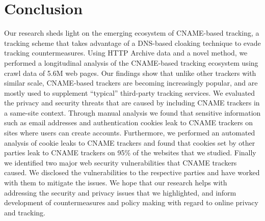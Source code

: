 \section{Conclusion}

Our research sheds light on the emerging ecosystem of CNAME-based tracking, a tracking scheme that takes advantage of a DNS-based cloaking technique to evade tracking countermeasures.
Using HTTP Archive data and a novel method, we performed a longitudinal analysis of the CNAME-based tracking ecosystem using crawl data of 5.6M web pages.
Our findings show that unlike other trackers with similar scale, CNAME-based trackers are becoming increasingly popular, and are mostly used to supplement ``typical'' third-party tracking services.
We evaluated the privacy and security threats that are caused by including CNAME trackers in a same-site context.
Through manual analysis we found that sensitive information such as email addresses and authentication cookies leak to CNAME trackers on sites where users can create accounts.
Furthermore, we performed an automated analysis of cookie leaks to CNAME trackers and found that cookies set by other parties leak to CNAME trackers on 95\% of the websites that we studied.
Finally we identified two major web security vulnerabilities that CNAME trackers caused.
We disclosed the vulnerabilities to the respective parties and have worked with them to mitigate the issues.
We hope that our research helps with addressing the security and privacy issues that we highlighted, and inform development of countermeasures and policy making with regard to online privacy and tracking. 
